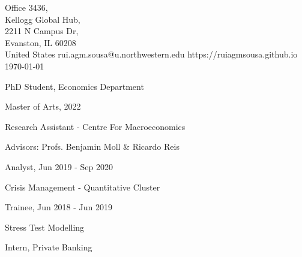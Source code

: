 \documentclass{practical-resume}
\begin{document}
\namehead

\begin{address}{
	Office 3436, \\
	Kellogg Global Hub, \\
	2211 N Campus Dr, \\
	Evanston, IL 60208 \\
	United States
}
{rui.agm.sousa@u.northwestern.edu}
{https://ruiagmsousa.github.io}
{\today}
\end{address}

\begin{position}{PhD Student, Economics Department}{}
	\item Master of Arts, 2022
\end{position}


	\begin{position}{Research Assistant - }{Centre For Macroeconomics}
		\item Advisors: Profs. Benjamin Moll \& Ricardo Reis
	\end{position}


	\begin{position}{Analyst, }{Jun 2019 - Sep 2020}
		\item Crisis Management - Quantitative Cluster
	\end{position}
	\begin{position}{Trainee, }{Jun 2018 - Jun 2019}
		\item Stress Test Modelling
	\end{position}
		
	\begin{position}[noitemize]{Intern, }{Private Banking}
	\end{position}
	
	
\end{document}
